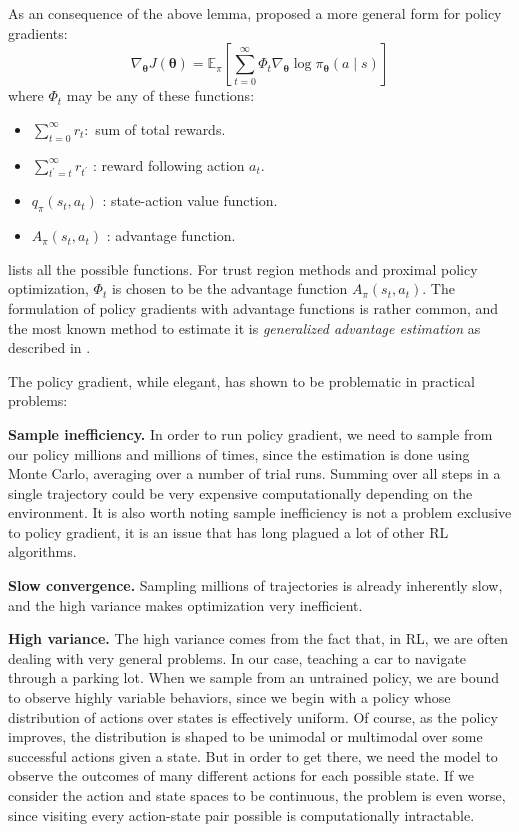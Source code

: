 As an consequence of the above lemma, \cite{https://doi.org/10.48550/arxiv.1506.02438} proposed a more general form for policy gradients:
\begin{equation}
    \nabla_{\boldsymbol\theta} J(\boldsymbol\theta) = \mathbb{E}_\pi\left[\sum_{t=0}^\infty\Phi_t\nabla_{\boldsymbol\theta}\log{\pi_{\boldsymbol\theta}(a \mid s)}\right]
\end{equation}
where $\Phi_t$ may be any of these functions:
\begin{itemize}
    \item $\sum_{t=0}^{\infty} r_t:$ sum of total rewards.
    \item $\sum_{t^{\prime}=t}^{\infty} r_{t^{\prime}}$ : reward following action $a_t$.
    \item $q_\pi\left(s_t, a_t\right)$ : state-action value function.
    \item $A_\pi\left(s_t, a_t\right)$ : advantage function.
\end{itemize}
\cite{https://doi.org/10.48550/arxiv.1506.02438} lists all the possible functions. For trust region methods and proximal policy optimization, $\Phi_t$ is chosen to be the advantage function $A_\pi\left(s_t, a_t\right)$. The formulation of policy gradients with advantage functions is rather common, and the most known method to estimate it is \textit{generalized advantage estimation} as described in \cite{https://doi.org/10.48550/arxiv.1506.02438}.

The policy gradient, while elegant, has shown to be problematic in practical problems:

\textbf{Sample inefficiency.} In order to run policy gradient, we need to sample from our policy millions and millions of times, since the estimation is done using Monte Carlo, averaging over a number of trial runs. Summing over all steps in a single trajectory could be very expensive computationally depending on the environment. It is also worth noting sample inefficiency is not a problem exclusive to policy gradient, it is an issue that has long plagued a lot of other RL algorithms.

\textbf{Slow convergence.} Sampling millions of trajectories is already inherently slow, and the high variance makes optimization very inefficient.

\textbf{High variance.} The high variance comes from the fact that, in RL, we are often dealing with very general problems. In our case, teaching a car to navigate through a parking lot. When we sample from an untrained policy, we are bound to observe highly variable behaviors, since we begin with a policy whose distribution of actions over states is effectively uniform. Of course, as the policy improves, the distribution is shaped to be unimodal or multimodal over some successful actions given a state. But in order to get there, we need the model to observe the outcomes of many different actions for each possible state. If we consider the action and state spaces to be continuous, the problem is even worse, since visiting every action-state pair possible is computationally intractable.

